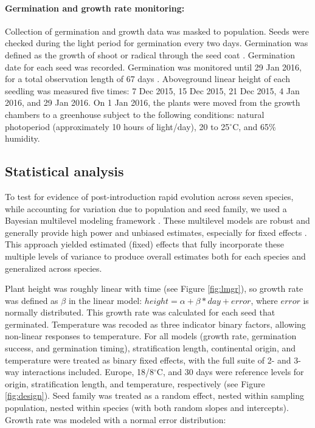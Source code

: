 \documentclass[11pt]{article}\usepackage[]{graphicx}\usepackage[]{color}
\begin{document}
	\paragraph{Germination and growth rate monitoring:}  Collection of germination and growth data was masked to population. Seeds were checked during the light period for germination every two days. Germination was defined as the growth of shoot or radical through the seed coat \parencite{Baskin1998,Popay1970}. Germination date for each seed was recorded.  Germination was monitored until 29 Jan 2016, for a total observation length of 67 days  \parencite[this is longer than the typical two-week germination trials according to][]{Baskin1998,Wulff1994}. Aboveground linear height of each seedling was measured five times: 7 Dec 2015, 15 Dec 2015, 21 Dec 2015, 4 Jan 2016, and 29 Jan 2016. On 1 Jan 2016, the plants were moved from the growth chambers to a greenhouse subject to the following conditions: natural photoperiod (approximately 10 hours of light/day), 20 to 25$^\circ$C, and 65\% humidity.
	\subsection{Statistical analysis} 
	To test for evidence of post-introduction rapid evolution across seven species, while accounting for variation due to population and seed family, we used a Bayesian multilevel modeling framework \parencite{Carpenter2017}. These multilevel models are 
robust and generally provide high power and unbiased estimates, especially for fixed effects \parencite{Paccagnella2011}. This approach yielded estimated (fixed) effects that fully incorporate these multiple levels of variance to produce overall estimates both for each species and generalized across species. 

Plant height was roughly linear with time (see Figure \ref{fig:lmgr}), so growth rate was defined as $\beta$ in the linear model: $height = \alpha + \beta*day + error $, where $error$ is normally distributed. This growth rate was calculated for each seed that germinated. Temperature was recoded as three indicator binary factors, allowing non-linear responses to temperature. For all models (growth rate, germination success, and germination timing), stratification length, continental origin, and temperature were treated as binary fixed effects, with the full suite of 2- and 3-way interactions included. Europe, 18/8$^\circ$C, and 30 days were reference levels for origin, stratification length, and temperature, respectively (see Figure \ref{fig:design}). Seed family was treated as a random effect, nested within sampling population, nested within species (with both random slopes and intercepts). Growth rate was modeled with a normal error distribution: 
\end{document}
